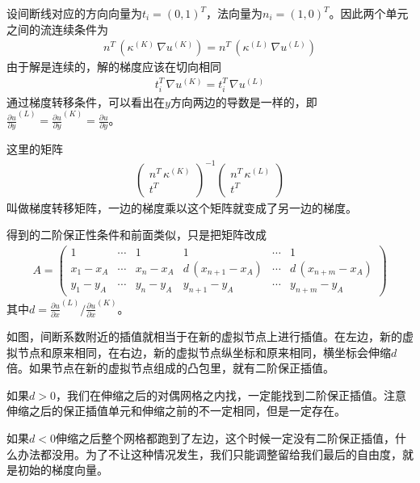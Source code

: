 \documentclass[12pt,a4paper]{article}
\theoremstyle{definition}
\begin{document}
设间断线对应的方向向量为$t_i = (0,1)^T$，法向量为$n_i = (1,0)^T$。因此两个单元之间的流连续条件为
\begin{align*}
n^T \, (\kappa^{(K)} \, \nabla u^{(K)}) = n^T \, (\kappa^{(L)} \, \nabla u^{(L)})
\end{align*}
由于解是连续的，解的梯度应该在切向相同
\begin{align*}
t_i^T \, \nabla u^{(K)} = t_i^T \, \nabla u^{(L)}
\end{align*}
通过梯度转移条件，可以看出在$y$方向两边的导数是一样的，即$\frac{\partial u}{\partial y}^{(L)} = \frac{\partial u}{\partial y}^{(K)} = \frac{\partial u}{\partial y}$。

这里的矩阵
\begin{align*}
\left(\begin{array}{c}
n^T \, \kappa^{(K)} \\
t^T
\end{array}
\right)^{-1}
\left(\begin{array}{c}
n^T \, \kappa^{(L)} \\
t^T
\end{array}
\right)
\end{align*}
叫做梯度转移矩阵，一边的梯度乘以这个矩阵就变成了另一边的梯度。

得到的二阶保正性条件和前面类似，只是把矩阵改成
\begin{align*}
A = \left(\begin{array}{cccccc}
1 & \cdots & 1 & 1 & \cdots & 1 \\
x_1 - x_A & \cdots & x_n - x_A & d \, (x_{n+1} - x_A) & \cdots & d \, (x_{n+m} - x_A) \\
y_1 - y_A & \cdots & y_n - y_A & y_{n+1} - y_A & \cdots & y_{n+m} - y_A
\end{array}
\right)
\end{align*}
其中$d = \frac{\partial u}{\partial x}^{(L)} / \frac{\partial u}{\partial x}^{(K)}$。

如图，间断系数附近的插值就相当于在新的虚拟节点上进行插值。在左边，新的虚拟节点和原来相同，在右边，新的虚拟节点纵坐标和原来相同，横坐标会伸缩$d$倍。如果节点在新的虚拟节点组成的凸包里，就有二阶保正插值。

如果$d > 0$，我们在伸缩之后的对偶网格之内找，一定能找到二阶保正插值。注意伸缩之后的保正插值单元和伸缩之前的不一定相同，但是一定存在。

如果$d < 0$伸缩之后整个网格都跑到了左边，这个时候一定没有二阶保正插值，什么办法都没用。为了不让这种情况发生，我们只能调整留给我们最后的自由度，就是初始的梯度向量。
\end{document}
